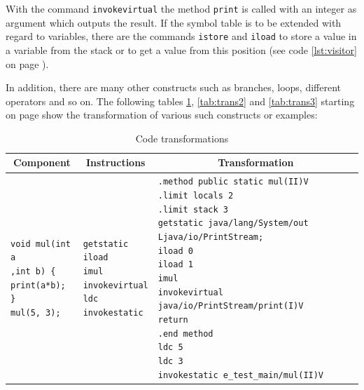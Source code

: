 With the command \texttt{invokevirtual} the method \texttt{print} is called with an integer as argument which outputs the result. If the symbol table is to be extended with regard to variables, there are the commands \texttt{istore} and \texttt{iload} to store a value in a variable from the stack or to get a value from this position (see code \ref{lst:visitor} on page \pageref{lst:visitor}).

In addition, there are many other constructs such as branches, loops, different operators and so on. The following tables \ref{tab:trans}, \ref{tab:trans2} and \ref{tab:trans3} starting on page \pageref{tab:trans} show the transformation of various such constructs or examples:

\newpage

\begin{table}[bth!]
	\footnotesize
	\centering
	\caption{Code transformations}
	\label{tab:trans}
	\begin{tabular}{|l|l|l|}
		\hline
		\multicolumn{1}{|c|}{\textbf{Component}} & \multicolumn{1}{c|}{\textbf{Instructions}} & \multicolumn{1}{c|}{\textbf{Transformation}} \\ \hline		
		\makecell[l]{\texttt{void mul(int a} \\ \quad\texttt{,int b) \{} \\ \quad\texttt{print(a*b);} \\ \texttt{\}} \\ \texttt{mul(5, 3);}} & \makecell[l]{\texttt{getstatic} \\ \texttt{iload} \\ \texttt{imul} \\ \texttt{invokevirtual} \\ \texttt{ldc} \\ \texttt{invokestatic}} & \makecell[l]{\texttt{.method public static mul(II)V} \\ \texttt{.limit locals 2} \\ \texttt{.limit stack 3} \\ \texttt{getstatic java/lang/System/out Ljava/io/PrintStream;} \\ \texttt{iload 0} \\ \texttt{iload 1} \\ \texttt{imul} \\ \texttt{invokevirtual java/io/PrintStream/print(I)V} \\ \texttt{return} \\ \texttt{.end method} \\ \texttt{ldc 5} \\ \texttt{ldc 3} \\ \texttt{invokestatic e\_test\_main/mul(II)V}} \\ \hline	

\end{tabular}
\end{table}
